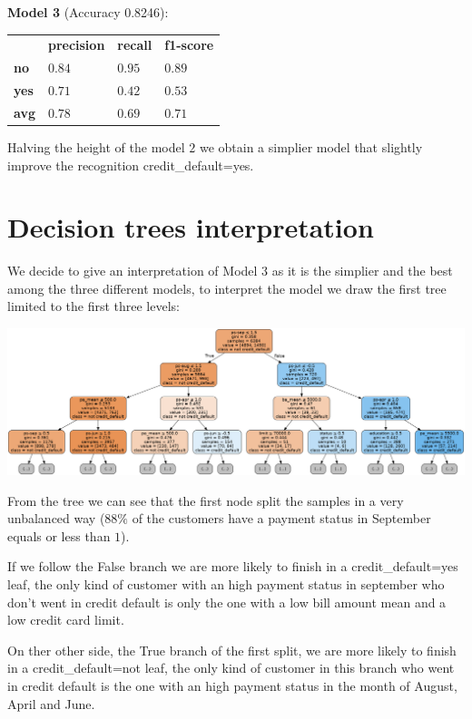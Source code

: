 \medskip

\textbf{Model 3} (Accuracy 0.8246):

\begin{table}[h]
\centering
\begin{adjustbox}{width=.30\textwidth}
\small
\begin{tabular}{llll}
               & \textbf{precision} & \textbf{recall} & \textbf{f1-score} \\ \rowcolor[HTML]{EFEFEF} 
 \textbf{no}   &  $0.84$            & $0.95$          & $0.89$            \\
 \textbf{yes}  &  $0.71$            & $0.42$          & $0.53$            \\ \rowcolor[HTML]{EFEFEF} 
 \textbf{avg}  &  $0.78$            & $0.69$          & $0.71$            \\
\end{tabular}
\end{adjustbox}
\end{table}

Halving the height of the model $2$ we obtain a simplier model that slightly improve the recognition credit\_default=yes. 

\section{Decision trees interpretation}

We decide to give an interpretation of Model 3 as it is the simplier and the best among the three different models, to interpret the model we draw the first tree limited to the first three levels:

  \begin{minipage}[h]{1\textwidth}
    \includegraphics[width=1\textwidth]{img/ch5/model3}
  \end{minipage}

\smallskip

From the tree we can see that the first node split the samples in a very unbalanced way ($88\%$ of the customers have a payment status in September equals or less than $1$). 

\smallskip

If we follow the False branch we are more likely to finish in a credit\_default=yes leaf, the only kind of customer with an high payment status in september who don't went in credit default is only the one with a low bill amount mean and a low credit card limit.

\smallskip

On ther other side, the True branch of the first split, we are more likely to finish in a credit\_default=not leaf, the only kind of customer in this branch who went in credit default is the one with an high payment status in the month of August, April and June.
